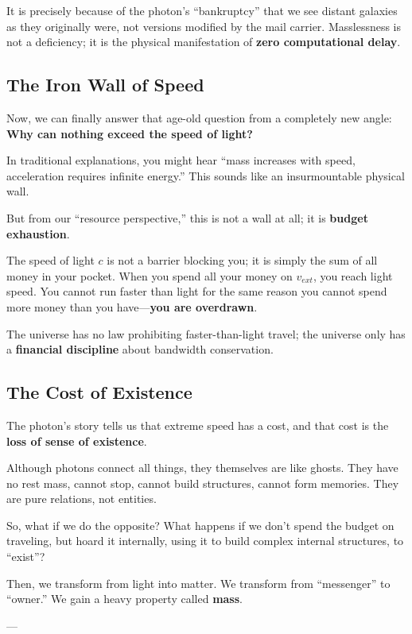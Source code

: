 \documentclass[11pt,a4paper,twoside]{book}
\begin{document}
It is precisely because of the photon's ``bankruptcy'' that we see distant galaxies as they originally were, not versions modified by the mail carrier. Masslessness is not a deficiency; it is the physical manifestation of \textbf{zero computational delay}.

\subsection{The Iron Wall of Speed}

Now, we can finally answer that age-old question from a completely new angle: \textbf{Why can nothing exceed the speed of light?}

In traditional explanations, you might hear ``mass increases with speed, acceleration requires infinite energy.'' This sounds like an insurmountable physical wall.

But from our ``resource perspective,'' this is not a wall at all; it is \textbf{budget exhaustion}.

The speed of light $c$ is not a barrier blocking you; it is simply the sum of all money in your pocket. When you spend all your money on $v_{ext}$, you reach light speed. You cannot run faster than light for the same reason you cannot spend more money than you have---\textbf{you are overdrawn}.

The universe has no law prohibiting faster-than-light travel; the universe only has a \textbf{financial discipline} about bandwidth conservation.

\subsection{The Cost of Existence}

The photon's story tells us that extreme speed has a cost, and that cost is the \textbf{loss of sense of existence}.

Although photons connect all things, they themselves are like ghosts. They have no rest mass, cannot stop, cannot build structures, cannot form memories. They are pure relations, not entities.

So, what if we do the opposite? What happens if we don't spend the budget on traveling, but hoard it internally, using it to build complex internal structures, to ``exist''?

Then, we transform from light into matter. We transform from ``messenger'' to ``owner.'' We gain a heavy property called \textbf{mass}.

---
\end{document}
